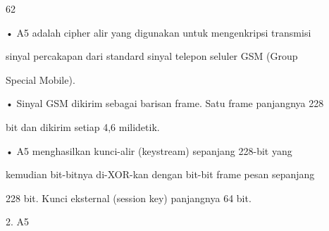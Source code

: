 \documentclass{article}
\begin{document}

62

• A5 adalah cipher alir yang digunakan untuk mengenkripsi transmisi 

sinyal percakapan dari standard sinyal telepon seluler GSM (Group 

Special Mobile).

• Sinyal GSM dikirim sebagai barisan frame. Satu frame panjangnya 228 

bit dan dikirim setiap 4,6 milidetik. 

• A5 menghasilkan kunci-alir (keystream) sepanjang 228-bit yang 

kemudian bit-bitnya di-XOR-kan dengan bit-bit frame pesan sepanjang 

228 bit. Kunci eksternal (session key) panjangnya 64 bit.

2. A5
\end{document}
